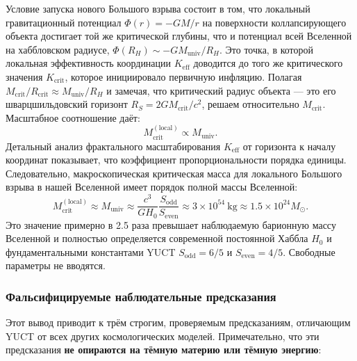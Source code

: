 \documentclass[11pt,a4paper]{article}
\begin{document}
	Условие запуска нового Большого взрыва состоит в том, что локальный гравитационный потенциал \(\Phi(r) = -GM/r\) на поверхности коллапсирующего объекта достигает той же критической глубины, что и потенциал всей Вселенной на хаббловском радиусе, \(\Phi(R_H) \sim -G M_{\mathrm{univ}}/R_H\). Это точка, в которой локальная эффективность координации \(K_{\mathrm{eff}}\) доводится до того же критического значения \(K_{\mathrm{crit}}\), которое инициировало первичную инфляцию. Полагая \(M_{\mathrm{crit}}/R_{\mathrm{crit}} \approx M_{\mathrm{univ}}/R_H\) и замечая, что критический радиус объекта — это его шварцшильдовский горизонт \(R_S = 2GM_{\mathrm{crit}}/c^2\), решаем относительно \(M_{\mathrm{crit}}\). Масштабное соотношение даёт:
	\begin{equation}
		M_{\mathrm{crit}}^{\mathrm{(local)}} \propto M_{\mathrm{univ}}.
	\end{equation}
	Детальный анализ фрактального масштабирования \(K_{\mathrm{eff}}\) от горизонта к началу координат \cite{AppendixL} показывает, что коэффициент пропорциональности порядка единицы. Следовательно, макроскопическая критическая масса для локального Большого взрыва в нашей Вселенной имеет порядок полной массы Вселенной:
	\begin{equation}
		\boxed{ M_{\mathrm{crit}}^{\mathrm{(local)}} \approx M_{\mathrm{univ}} \approx \frac{c^3}{G H_0} \frac{S_{\mathrm{odd}}}{S_{\mathrm{even}}} \approx 3 \times 10^{54}\ \mathrm{kg} \approx 1.5 \times 10^{24} M_{\odot} }.
		\label{eq:Mcrit-macro}
	\end{equation}
	Это значение примерно в 2.5 раза превышает наблюдаемую барионную массу Вселенной и полностью определяется современной постоянной Хаббла \(H_0\) и фундаментальными константами YUCT \(S_{\mathrm{odd}}=6/5\) и \(S_{\mathrm{even}}=4/5\). Свободные параметры не вводятся.
	
	\subsubsection{Фальсифицируемые наблюдательные предсказания}
	
	Этот вывод приводит к трём строгим, проверяемым предсказаниям, отличающим YUCT от всех других космологических моделей. Примечательно, что эти предсказания \textbf{не опираются на тёмную материю или тёмную энергию}:
	
\end{document}

